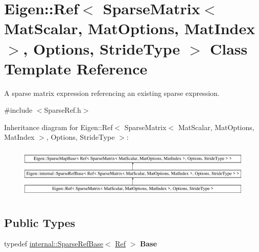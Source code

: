 \hypertarget{class_eigen_1_1_ref_3_01_sparse_matrix_3_01_mat_scalar_00_01_mat_options_00_01_mat_index_01_4_0024ec28acf7b4e76d8ff99a0bdc39c296}{}\section{Eigen\+::Ref$<$ Sparse\+Matrix$<$ Mat\+Scalar, Mat\+Options, Mat\+Index $>$, Options, Stride\+Type $>$ Class Template Reference}
\label{class_eigen_1_1_ref_3_01_sparse_matrix_3_01_mat_scalar_00_01_mat_options_00_01_mat_index_01_4_0024ec28acf7b4e76d8ff99a0bdc39c296}


A sparse matrix expression referencing an existing sparse expression.  




{\ttfamily \#include $<$Sparse\+Ref.\+h$>$}

Inheritance diagram for Eigen\+::Ref$<$ Sparse\+Matrix$<$ Mat\+Scalar, Mat\+Options, Mat\+Index $>$, Options, Stride\+Type $>$\+:\begin{figure}[H]
\begin{center}
\leavevmode
\includegraphics[height=2.500000cm]{class_eigen_1_1_ref_3_01_sparse_matrix_3_01_mat_scalar_00_01_mat_options_00_01_mat_index_01_4_0024ec28acf7b4e76d8ff99a0bdc39c296}
\end{center}
\end{figure}
\subsection*{Public Types}
\begin{DoxyCompactItemize}
\item 
\mbox{\label{class_eigen_1_1_ref_3_01_sparse_matrix_3_01_mat_scalar_00_01_mat_options_00_01_mat_index_01_4_0024ec28acf7b4e76d8ff99a0bdc39c296_adfa4fced570eab7a4539df608f7078f2}} 
typedef \mbox{\hyperlink{class_eigen_1_1internal_1_1_sparse_ref_base}{internal\+::\+Sparse\+Ref\+Base}}$<$ \mbox{\hyperlink{class_eigen_1_1_ref}{Ref}} $>$ {\bfseries Base}
\end{DoxyCompactItemize}
